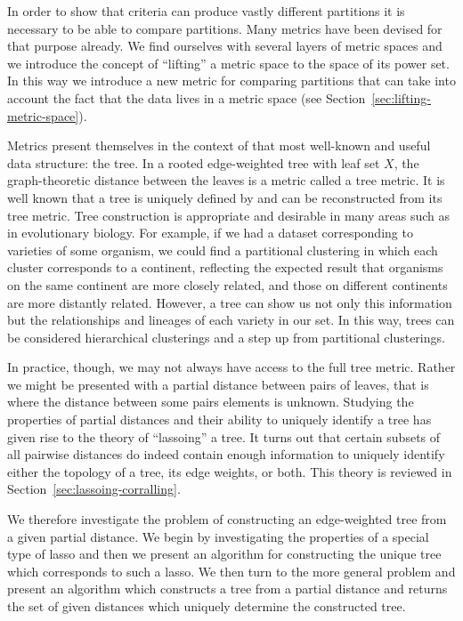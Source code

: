 In order to show that criteria can produce vastly different partitions it is
necessary to be able to compare partitions.  Many metrics have been devised
for that purpose already.  We find ourselves with several layers of metric
spaces and we introduce the concept of ``lifting'' a metric space to the space
of its power set.  In this way we introduce a new metric for comparing
partitions that can take into account the fact that the data lives in a metric
space (see Section~\ref{sec:lifting-metric-space}).

Metrics present themselves in the context of that most well-known and useful
data structure: the tree.  In a rooted edge-weighted tree with leaf set $X$,
the graph-theoretic distance between the leaves is a metric called a tree
metric.  It is well known that a tree is uniquely defined by and can be
reconstructed from its tree metric.  Tree construction is appropriate and
desirable in many areas such as in evolutionary biology.  For example, if we
had a dataset corresponding to varieties of some organism, we could find a
partitional clustering in which each cluster corresponds to a continent,
reflecting the expected result that organisms on the same continent are more
closely related, and those on different continents are more distantly related.
However, a tree can show us not only this information but the relationships
and lineages of each variety in our set.  In this way, trees can be considered
hierarchical clusterings and a step up from partitional clusterings.

In practice, though, we may not always have access to the full tree metric.
Rather we might be presented with a partial distance between pairs of leaves,
that is where the distance between some pairs elements is unknown.  Studying
the properties of partial distances and their ability to uniquely identify a
tree has given rise to the theory of ``lassoing'' a tree.  It turns out that
certain subsets of all pairwise distances do indeed contain enough information
to uniquely identify either the topology of a tree, its edge weights, or
both.  This theory is reviewed in Section~\ref{sec:lassoing-corralling}.

We therefore investigate the problem of constructing an edge-weighted tree
from a given partial distance.  We begin by investigating the properties of a
special type of lasso and then we present an algorithm for constructing the
unique tree which corresponds to such a lasso.  We then turn to the more
general problem and present an algorithm which constructs a tree from a
partial distance and returns the set of given distances which uniquely
determine the constructed tree.


